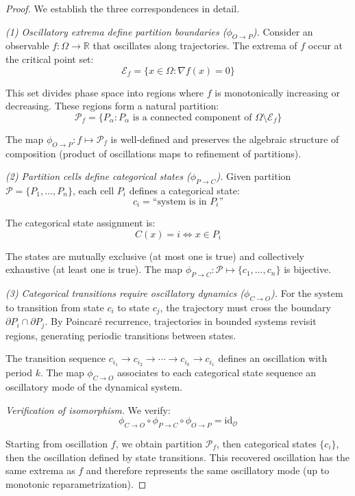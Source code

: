\documentclass[twocolumn,10pt]{article}
\theoremstyle{remark}
\begin{document}
\begin{proof}
We establish the three correspondences in detail.

\textit{(1) Oscillatory extrema define partition boundaries ($\phi_{O \to P}$).} Consider an observable $f: \Omega \to \mathbb{R}$ that oscillates along trajectories. The extrema of $f$ occur at the critical point set:
\begin{equation}
\mathcal{E}_f = \{x \in \Omega : \nabla f(x) = 0\}
\end{equation}

This set divides phase space into regions where $f$ is monotonically increasing or decreasing. These regions form a natural partition:
\begin{equation}
\mathcal{P}_f = \{P_\alpha : P_\alpha \text{ is a connected component of } \Omega \setminus \mathcal{E}_f\}
\end{equation}

The map $\phi_{O \to P}: f \mapsto \mathcal{P}_f$ is well-defined and preserves the algebraic structure of composition (product of oscillations maps to refinement of partitions).

\textit{(2) Partition cells define categorical states ($\phi_{P \to C}$).} Given partition $\mathcal{P} = \{P_1, \ldots, P_n\}$, each cell $P_i$ defines a categorical state:
\begin{equation}
c_i = \text{``system is in } P_i\text{''}
\end{equation}

The categorical state assignment is:
\begin{equation}
C(x) = i \iff x \in P_i
\end{equation}

The states are mutually exclusive (at most one is true) and collectively exhaustive (at least one is true). The map $\phi_{P \to C}: \mathcal{P} \mapsto \{c_1, \ldots, c_n\}$ is bijective.

\textit{(3) Categorical transitions require oscillatory dynamics ($\phi_{C \to O}$).} For the system to transition from state $c_i$ to state $c_j$, the trajectory must cross the boundary $\partial P_i \cap \partial P_j$. By Poincar\'e recurrence, trajectories in bounded systems revisit regions, generating periodic transitions between states.

The transition sequence $c_{i_1} \to c_{i_2} \to \cdots \to c_{i_k} \to c_{i_1}$ defines an oscillation with period $k$. The map $\phi_{C \to O}$ associates to each categorical state sequence an oscillatory mode of the dynamical system.

\textit{Verification of isomorphism.} We verify:
\begin{equation}
\phi_{C \to O} \circ \phi_{P \to C} \circ \phi_{O \to P} = \text{id}_{\mathcal{O}}
\end{equation}

Starting from oscillation $f$, we obtain partition $\mathcal{P}_f$, then categorical states $\{c_i\}$, then the oscillation defined by state transitions. This recovered oscillation has the same extrema as $f$ and therefore represents the same oscillatory mode (up to monotonic reparametrization).
\end{proof}
\end{document}
